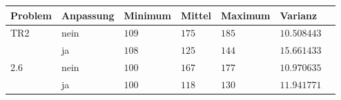 \begin{tabularx}{\textwidth}{l X X X X X X}
\toprule
\textbf{Problem} & Anpassung & Minimum & Mittel & Maximum & Varianz  \\
\midrule
TR2 & nein & $109$ & $175$ & $185$ & $10.508443$ \\
& ja & $108$ & $125$ & $144$ & $15.661433$ \\
2.6 & nein & $100$ & $167$ & $177$ & $10.970635$ \\
& ja & $100$ & $118$ & $130$ & $11.941771$ \\
\bottomrule
\end{tabularx}
